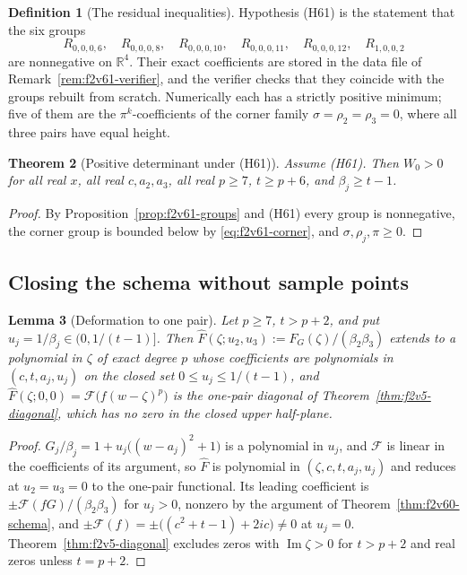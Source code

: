\documentclass[11pt]{article}
\newtheorem{theorem}{Theorem}[section]
\newtheorem{lemma}[theorem]{Lemma}
\theoremstyle{definition}
\newtheorem{definition}[theorem]{Definition}
\theoremstyle{remark}
\begin{document}
\begin{definition}[The residual inequalities]
\label{def:f2v61-open}
Hypothesis (H61) is the statement that the six groups
\begin{equation}
 R_{0,0,0,6},\quad R_{0,0,0,8},\quad R_{0,0,0,10},\quad R_{0,0,0,11},\quad
 R_{0,0,0,12},\quad R_{1,0,0,2}
 \label{eq:f2v61-open}
\end{equation}
are nonnegative on \(\mathbb R^4\).  Their exact coefficients are stored
in the data file of Remark~\ref{rem:f2v61-verifier}, and the verifier
checks that they coincide with the groups rebuilt from scratch.
Numerically each has a strictly positive minimum; five of them are the
\(\pi^k\)-coefficients of the corner family \(\sigma=\rho_2=\rho_3=0\),
where all three pairs have equal height.
\end{definition}

\begin{theorem}[Positive determinant under (H61)]
\label{thm:f2v61-W0}
Assume (H61).  Then \(W_0>0\) for all real \(x\), all real
\(c,a_2,a_3\), all real \(p\ge7\), \(t\ge p+6\), and \(\beta_j\ge t-1\).
\end{theorem}

\begin{proof}
By Proposition~\ref{prop:f2v61-groups} and (H61) every group is
nonnegative, the corner group is bounded below by
\eqref{eq:f2v61-corner}, and \(\sigma,\rho_j,\pi\ge0\).
\end{proof}

\subsection{Closing the schema without sample points}

\begin{lemma}[Deformation to one pair]
\label{lem:f2v61-deform}
Let \(p\ge7\), \(t>p+2\), and put \(u_j=1/\beta_j\in(0,1/(t-1)]\).  Then
\(\widehat F(\zeta;u_2,u_3):=F_G(\zeta)/(\beta_2\beta_3)\) extends to a
polynomial in \(\zeta\) of exact degree \(p\) whose coefficients are
polynomials in \((c,t,a_j,u_j)\) on the closed set \(0\le u_j\le1/(t-1)\),
and \(\widehat F(\zeta;0,0)=\mathcal F\bigl(f(w-\zeta)^p\bigr)\) is the
one-pair diagonal of Theorem~\ref{thm:f2v5-diagonal}, which has no zero
in the closed upper half-plane.
\end{lemma}

\begin{proof}
\(G_j/\beta_j=1+u_j\bigl((w-a_j)^2+1\bigr)\) is a polynomial in
\(u_j\), and \(\mathcal F\) is linear in the coefficients of its
argument, so \(\widehat F\) is polynomial in \((\zeta,c,t,a_j,u_j)\) and
reduces at \(u_2=u_3=0\) to the one-pair functional.  Its leading
coefficient is \(\pm\mathcal F(fG)/(\beta_2\beta_3)\) for \(u_j>0\),
nonzero by the argument of Theorem~\ref{thm:f2v60-schema}, and
\(\pm\mathcal F(f)=\pm\bigl((c^2+t-1)+2ic\bigr)\ne0\) at \(u_j=0\).
Theorem~\ref{thm:f2v5-diagonal} excludes zeros with
\(\operatorname{Im}\zeta>0\) for \(t>p+2\) and real zeros unless
\(t=p+2\).
\end{proof}
\end{document}
